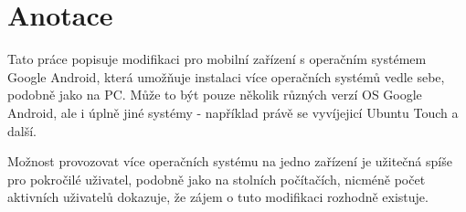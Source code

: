 \documentclass[12pt, a4paper, oneside]{article}
\begin{document}
\section*{Anotace}


Tato práce popisuje modifikaci pro mobilní zařízení s operačním systémem Google Android, která umožňuje instalaci více operačních systémů vedle sebe, podobně jako na PC. Může to být pouze několik různých verzí OS Google Android, ale i úplně jiné systémy - například právě se vyvíjejicí Ubuntu Touch a další.

Možnost provozovat více operačních systému na jedno zařízení je užitečná spíše pro pokročilé uživatel, podobně jako na stolních počítačích, nicméně počet aktivních uživatelů dokazuje, že zájem o tuto modifikaci rozhodně existuje.






\end{document}
